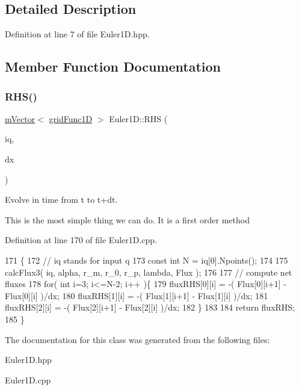 \subsection{Detailed Description}


Definition at line 7 of file Euler1\+D.\+hpp.



\subsection{Member Function Documentation}
\mbox{\label{classEuler1D_a466e76f0be22e407e3b17072fb567fb4}} 
\subsubsection{\texorpdfstring{R\+H\+S()}{RHS()}}
{\footnotesize\ttfamily \hyperlink{classmVector}{m\+Vector}$<$ \hyperlink{classgridFunc1D}{grid\+Func1D} $>$ Euler1\+D\+::\+R\+HS (\begin{DoxyParamCaption}\item[{const \hyperlink{classmVector}{m\+Vector}$<$ \hyperlink{classgridFunc1D}{grid\+Func1D} $>$ \&}]{iq,  }\item[{double}]{dx }\end{DoxyParamCaption})}



Evolve in time from t to t+dt. 

This is the most simple thing we can do. It is a first order method 

Definition at line 170 of file Euler1\+D.\+cpp.


\begin{DoxyCode}
171 \{
172   \textcolor{comment}{// iq stands for input q}
173   \textcolor{keyword}{const} \textcolor{keywordtype}{int} N = iq[0].Npoints();
174   
175   calcFlux3( iq, alpha, r\_m, r\_0, r\_p, lambda, Flux );
176   
177   \textcolor{comment}{// compute net fluxes}
178   \textcolor{keywordflow}{for}( \textcolor{keywordtype}{int} i=3; i<=N-2; i++ )\{
179     fluxRHS[0][i] = -( Flux[0][i+1] - Flux[0][i] )/dx;
180     fluxRHS[1][i] = -( Flux[1][i+1] - Flux[1][i] )/dx;
181     fluxRHS[2][i] = -( Flux[2][i+1] - Flux[2][i] )/dx;
182   \}
183 
184   \textcolor{keywordflow}{return} fluxRHS;
185 \}
\end{DoxyCode}


The documentation for this class was generated from the following files\+:\begin{DoxyCompactItemize}
\item 
Euler1\+D.\+hpp\item 
Euler1\+D.\+cpp\end{DoxyCompactItemize}
